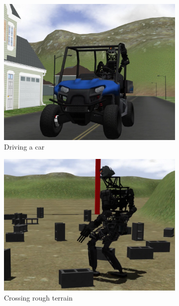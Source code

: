\begin{figure}
  \centering
  \begin{subfigure}[b]{0.3\textwidth}
    \includegraphics[width=\textwidth]{pics/darpa_car}
    \caption{Driving a car}
    \label{fig:vrc_car}
  \end{subfigure}
  \begin{subfigure}[b]{0.3\textwidth}
    \includegraphics[width=\textwidth]{pics/darpa_walking}
    \caption{Crossing rough terrain}
    \label{fig:vrc_walking}
  \end{subfigure}
  \begin{subfigure}[b]{0.3\textwidth}

\end{subfigure}
\end{figure}
